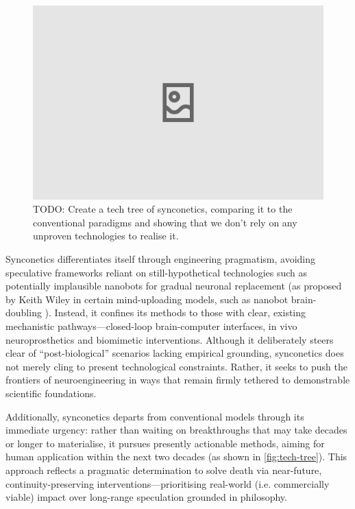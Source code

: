 \documentclass[10pt]{article}
\begin{document}
\begin{sloppypar}
  \begin{figure}[ht!]
    \centering
    \includegraphics[width=\textwidth]{figures/tech-tree.png}
    \caption{TODO: Create a tech tree of synconetics, comparing it to the conventional paradigms and showing that we don’t rely on any unproven technologies to realise it.}
    \label{fig:tech-tree}
  \end{figure}

  Synconetics differentiates itself through engineering pragmatism, avoiding speculative frameworks reliant on still-hypothetical technologies such as potentially implausible nanobots for gradual neuronal replacement (as proposed by Keith Wiley in certain mind-uploading models, such as nanobot brain-doubling \citep{wiley_taxonomy_2014}). Instead, it confines its methods to those with clear, existing mechanistic pathways—closed-loop brain-computer interfaces, in vivo neuroprosthetics and biomimetic interventions. Although it deliberately steers clear of “post-biological” scenarios lacking empirical grounding, synconetics does not merely cling to present technological constraints. Rather, it seeks to push the frontiers of neuroengineering in ways that remain firmly tethered to demonstrable scientific foundations.

  Additionally, synconetics departs from conventional models through its immediate urgency: rather than waiting on breakthroughs that may take decades or longer to materialise, it pursues presently actionable methods, aiming for human application within the next two decades (as shown in \autoref{fig:tech-tree}). This approach reflects a pragmatic determination to solve death via near-future, continuity-preserving interventions—prioritising real-world (i.e. commercially viable) impact over long-range speculation grounded in philosophy.


\end{sloppypar}
\end{document}

